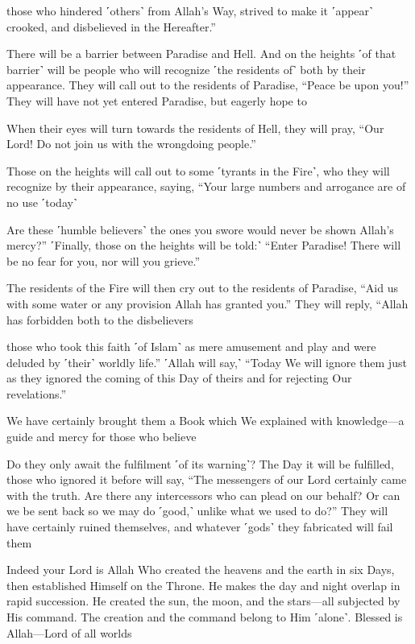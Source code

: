 those who hindered ˹others˺ from Allah’s Way, strived to make it ˹appear˺ crooked, and disbelieved in the Hereafter.”

There will be a barrier between Paradise and Hell. And on the heights ˹of that barrier˺ will be people who will recognize ˹the residents of˺ both by their appearance. They will call out to the residents of Paradise, “Peace be upon you!” They will have not yet entered Paradise, but eagerly hope to

When their eyes will turn towards the residents of Hell, they will pray, “Our Lord! Do not join us with the wrongdoing people.”

Those on the heights will call out to some ˹tyrants in the Fire˺, who they will recognize by their appearance, saying, “Your large numbers and arrogance are of no use ˹today˺

Are these ˹humble believers˺ the ones you swore would never be shown Allah’s mercy?” ˹Finally, those on the heights will be told:˺ “Enter Paradise! There will be no fear for you, nor will you grieve.”

The residents of the Fire will then cry out to the residents of Paradise, “Aid us with some water or any provision Allah has granted you.” They will reply, “Allah has forbidden both to the disbelievers

those who took this faith ˹of Islam˺ as mere amusement and play and were deluded by ˹their˺ worldly life.” ˹Allah will say,˺ “Today We will ignore them just as they ignored the coming of this Day of theirs and for rejecting Our revelations.”

We have certainly brought them a Book which We explained with knowledge—a guide and mercy for those who believe

Do they only await the fulfilment ˹of its warning˺? The Day it will be fulfilled, those who ignored it before will say, “The messengers of our Lord certainly came with the truth. Are there any intercessors who can plead on our behalf? Or can we be sent back so we may do ˹good,˺ unlike what we used to do?” They will have certainly ruined themselves, and whatever ˹gods˺ they fabricated will fail them

Indeed your Lord is Allah Who created the heavens and the earth in six Days, then established Himself on the Throne. He makes the day and night overlap in rapid succession. He created the sun, the moon, and the stars—all subjected by His command. The creation and the command belong to Him ˹alone˺. Blessed is Allah—Lord of all worlds

